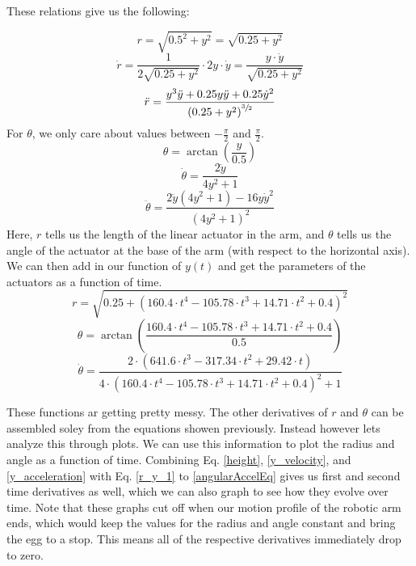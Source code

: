 \documentclass[nofoot,pdf-a,balance,colorlinks,upint,subscriptcorrection,varvw,mathalfa=cal=boondoxo]{asmeconf}
\begin{document}
    These relations give us the following:

    \begin{equation}\label{r_y_1}
        r = \sqrt{0.5^2+y^2} = \sqrt{0.25 + y^2}
	\end{equation}
    \begin{equation}
        \dot{r} = \frac{1}{2\sqrt{0.25+y^2}}\cdot2y\cdot\dot{y} = \frac{ y\cdot\dot{y}}{\sqrt{0.25+y^2}}
	\end{equation}
    \begin{equation}
        \ddot{r} = \frac{y^3 \ddot{y} + 0.25 y\ddot{y} + 0.25\dot{y}^2}{{\left(0.25 + y^2\right)}^{\sfrac{3}{2}}}
	\end{equation}
    For $\theta$, we only care about values between $-\frac{\pi}{2}$ and $\frac{\pi}{2}$.
    \begin{equation}
        \theta = \arctan{\left(\frac{y}{0.5}\right)}
	\end{equation}
    \begin{equation}
        \dot{\theta} = \frac{2\dot{y}}{4y^2 + 1}
	\end{equation}
    \begin{equation}\label{angularAccelEq}
        \ddot{\theta} = \frac{2\ddot{y}\left(4y^2+1\right) - 16y\dot{y}^2}{{\left(4y^2 + 1\right)}^2}
	\end{equation}
    Here, $r$ tells us the length of the linear actuator in the arm, and $\theta$ tells us the angle of the actuator at the base of the arm (with respect to the horizontal axis). We can then add in our function of $y\left(t\right)$ and get the parameters of the actuators as a function of time. 
	\begin{equation}
	r = \sqrt{0.25+\left( 160.4 \cdot t^4 - 105.78 \cdot t^3 + 14.71 \cdot t^2 + 0.4\right)^2}
	\end{equation}
	\begin{equation}
        \theta = \arctan{\left(\frac{160.4 \cdot t^4 - 105.78 \cdot t^3 + 14.71 \cdot t^2 + 0.4}{0.5}\right)}
	\end{equation}
	\begin{equation}
	    \dot{\theta} =\frac{2\cdot\left(641.6\cdot t^3 - 317.34\cdot t^2 + 29.42\cdot t\right)}{4\cdot\left(160.4 \cdot t^4 - 105.78 \cdot t^3 + 14.71 \cdot t^2 + 0.4\right)^2+1}
	\end{equation}

    These functions ar getting pretty messy. The other derivatives of $r$ and $\theta$ can be assembled soley from the equations showen previously. Instead however lets analyze this through plots. We can use this information to plot the radius and angle as a function of time. Combining Eq. \eqref{height}, \eqref{y_velocity}, and \eqref{y_acceleration} with Eq. \eqref{r_y_1} to \eqref{angularAccelEq} gives us first and second time derivatives as well, which we can also graph to see how they evolve over time. Note that these graphs cut off when our motion profile of the robotic arm ends, which would keep the values for the radius and angle constant and bring the egg to a stop. This means all of the respective derivatives immediately drop to zero.
\end{document}
